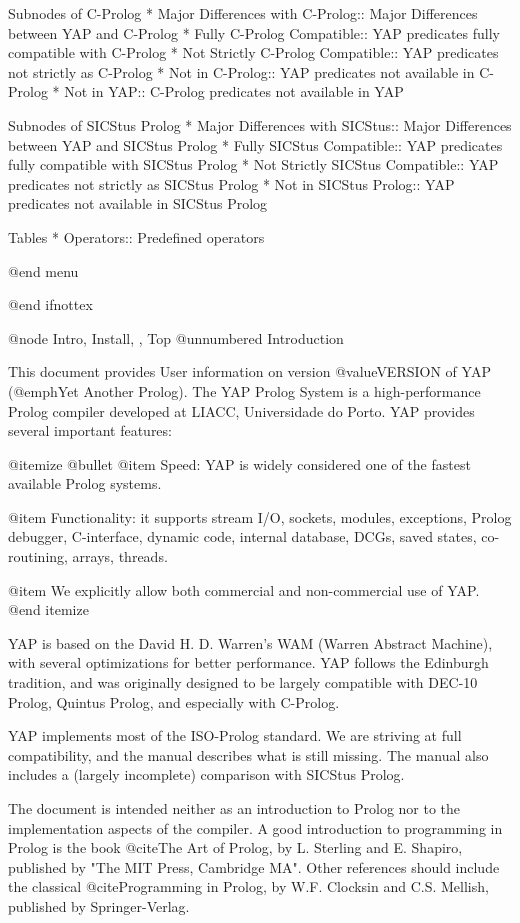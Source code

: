 Subnodes of C-Prolog
* Major Differences with C-Prolog:: Major Differences between YAP and C-Prolog
* Fully C-Prolog Compatible:: YAP predicates fully compatible with
C-Prolog
* Not Strictly C-Prolog Compatible:: YAP predicates not strictly as C-Prolog
* Not in C-Prolog:: YAP predicates not available in C-Prolog
* Not in YAP:: C-Prolog predicates not available in YAP

Subnodes of SICStus Prolog
* Major Differences with SICStus:: Major Differences between YAP and SICStus Prolog
* Fully SICStus Compatible:: YAP predicates fully compatible with
SICStus Prolog
* Not Strictly SICStus Compatible:: YAP predicates not strictly as
SICStus Prolog
* Not in SICStus Prolog:: YAP predicates not available in SICStus Prolog


Tables
* Operators:: Predefined operators

@end menu

@end ifnottex


@node Intro, Install, , Top
@unnumbered Introduction

This document provides User information on version @value{VERSION} of
YAP (@emph{Yet Another Prolog}). The YAP Prolog System is a
high-performance Prolog compiler developed at LIACC, Universidade do
Porto. YAP provides several important features:

@itemize @bullet
 @item Speed: YAP is widely considered one of the fastest available
Prolog systems.

 @item Functionality: it supports stream I/O, sockets, modules,
exceptions, Prolog debugger, C-interface, dynamic code, internal
database, DCGs, saved states, co-routining, arrays, threads.

 @item We explicitly allow both commercial and non-commercial use of YAP.
@end itemize

YAP is based on the David H. D. Warren's WAM (Warren Abstract Machine),
with several optimizations for better performance. YAP follows the
Edinburgh tradition, and was originally designed to be largely
compatible with DEC-10 Prolog, Quintus Prolog, and especially with
C-Prolog.

YAP implements most of the ISO-Prolog standard. We are striving at
full compatibility, and the manual describes what is still
missing. The manual also includes a (largely incomplete) comparison
with SICStus Prolog.

The document is intended neither as an introduction to Prolog nor to the
implementation aspects of the compiler. A good introduction to
programming in Prolog is the book @cite{The Art of Prolog}, by
L. Sterling and E. Shapiro, published by "The MIT Press, Cambridge
MA". Other references should include the classical @cite{Programming in
Prolog}, by W.F. Clocksin and C.S. Mellish, published by
Springer-Verlag.

